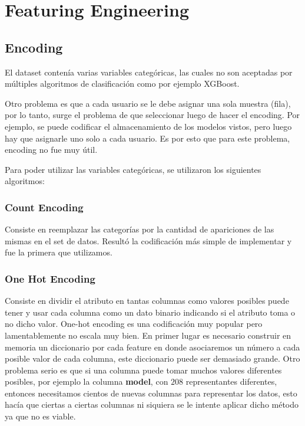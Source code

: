 \documentclass[a4paper ,12pt]{article}
\begin{document}
\newpage
\section{Featuring Engineering}

\subsection{Encoding}

El dataset contenía varias variables categóricas, las cuales no son aceptadas por
múltiples algoritmos de clasificación como por ejemplo XGBoost.

Otro problema es que a cada usuario se le debe asignar una sola muestra (fila), por lo tanto, surge el problema de que seleccionar luego de hacer el encoding. Por ejemplo, se puede codificar el almacenamiento de los modelos vistos, pero luego hay que asignarle uno solo a cada usuario. Es por esto que para este problema, encoding no fue muy útil.

Para poder utilizar las variables categóricas, se utilizaron los siguientes algoritmos:

\subsubsection{Count Encoding}
Consiste en reemplazar las categorías por la cantidad de
apariciones de las mismas en el set de datos. Resultó la codificación más simple de
implementar y fue la primera que utilizamos.

\subsubsection{One Hot Encoding}

Consiste en dividir el atributo en tantas columnas como valores posibles puede tener y usar cada columna como un dato binario indicando si el atributo toma o no dicho
valor. One-hot encoding es una codificación muy popular pero lamentablemente
no escala muy bien. En primer lugar es necesario construir en memoria un
diccionario por cada feature en donde asociaremos un número a cada posible
valor de cada columna, este diccionario puede ser demasiado grande. Otro
problema serio es que si una columna puede tomar muchos valores diferentes
posibles, por ejemplo la columna \textbf{model}, con $208$ representantes diferentes, entonces necesitamos cientos de nuevas columnas para representar los datos, esto hacía que ciertas a ciertas columnas ni siquiera se le intente aplicar dicho método ya que no es viable.
\end{document}
